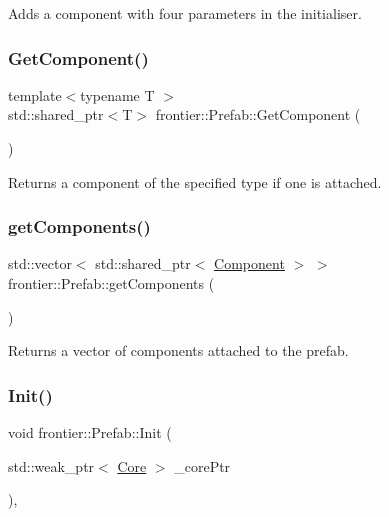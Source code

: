 Adds a component with four parameters in the initialiser. 

\mbox{\label{classfrontier_1_1_prefab_a54eab9e949addd7f9ed382893d60a56c}} 
\subsubsection{\texorpdfstring{Get\+Component()}{GetComponent()}}
{\footnotesize\ttfamily template$<$typename T $>$ \\
std\+::shared\+\_\+ptr$<$T$>$ frontier\+::\+Prefab\+::\+Get\+Component (\begin{DoxyParamCaption}{ }\end{DoxyParamCaption})\hspace{0.3cm}{\ttfamily [inline]}}



Returns a component of the specified type if one is attached. 

\mbox{\label{classfrontier_1_1_prefab_a0d857efae6fb692384a6ab0144d66898}} 
\subsubsection{\texorpdfstring{get\+Components()}{getComponents()}}
{\footnotesize\ttfamily std\+::vector$<$ std\+::shared\+\_\+ptr$<$ \hyperlink{classfrontier_1_1_component}{Component} $>$ $>$ frontier\+::\+Prefab\+::get\+Components (\begin{DoxyParamCaption}{ }\end{DoxyParamCaption})}



Returns a vector of components attached to the prefab. 

\mbox{\label{classfrontier_1_1_prefab_a69924d353fb96975efbba17dc0ba3f3a}} 
\subsubsection{\texorpdfstring{Init()}{Init()}}
{\footnotesize\ttfamily void frontier\+::\+Prefab\+::\+Init (\begin{DoxyParamCaption}\item[{std\+::weak\+\_\+ptr$<$ \hyperlink{classfrontier_1_1_core}{Core} $>$}]{\+\_\+core\+Ptr }\end{DoxyParamCaption})\hspace{0.3cm}{\ttfamily [override]}, {\ttfamily [virtual]}}



